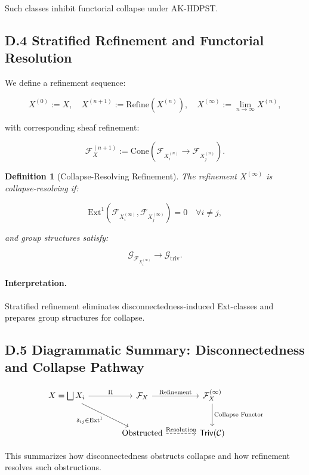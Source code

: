 \documentclass[11pt]{article}
\newtheorem{definition}[theorem]{Definition}
\begin{document}
Such classes inhibit functorial collapse under AK-HDPST.

\subsection*{D.4 Stratified Refinement and Functorial Resolution}

We define a refinement sequence:

\[
X^{(0)} := X, \quad X^{(n+1)} := \mathrm{Refine}(X^{(n)}), \quad X^{(\infty)} := \lim_{n \to \infty} X^{(n)},
\]

with corresponding sheaf refinement:

\[
\mathcal{F}_X^{(n+1)} := \mathrm{Cone}(\mathcal{F}_{X^{(n)}_i} \to \mathcal{F}_{X^{(n)}_j}).
\]

\begin{definition}[Collapse-Resolving Refinement]
The refinement \( X^{(\infty)} \) is \emph{collapse-resolving} if:

\[
\mathrm{Ext}^1(\mathcal{F}_{X^{(\infty)}_i}, \mathcal{F}_{X^{(\infty)}_j}) = 0 \quad \forall i \neq j,
\]

and group structures satisfy:

\[
\mathcal{G}_{\mathcal{F}_{X^{(\infty)}_i}} \longrightarrow \mathcal{G}_{\mathrm{triv}}.
\]
\end{definition}

\paragraph{Interpretation.}
Stratified refinement eliminates disconnectedness-induced Ext-classes and prepares group structures for collapse.

\subsection*{D.5 Diagrammatic Summary: Disconnectedness and Collapse Pathway}

\[
\begin{tikzcd}[column sep=large, row sep=large]
X = \bigsqcup X_i \arrow[r, "\Pi"] \arrow[dr, "\delta_{ij} \in \mathrm{Ext}^1"']
& \mathcal{F}_X \arrow[r, "\mathrm{Refinement}"]
& \mathcal{F}_X^{(\infty)} \arrow[d, "\text{Collapse Functor}"] \\
& \text{Obstructed} \arrow[r, dashed, "\text{Resolution}"]
& \mathsf{Triv}(\mathcal{C})
\end{tikzcd}
\]

This summarizes how disconnectedness obstructs collapse and how refinement resolves such obstructions.
\end{document}
